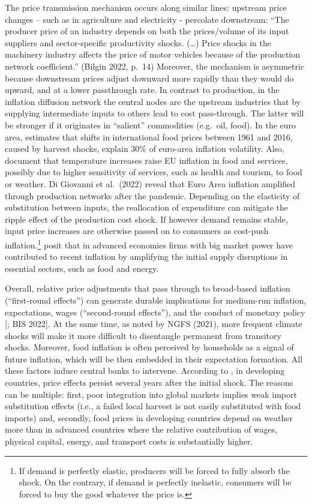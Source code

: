 \documentclass[
  letterpaper,
  DIV=11,
  numbers=noendperiod]{scrartcl}
\begin{document}
The price transmission mechanism occurs along similar lines: upstream
price changes -- such as in agriculture and electricity - percolate
downstream: ``The producer price of an industry depends on both the
prices/volume of its input suppliers and sector-specific productivity
shocks. (\ldots) Price shocks in the machinery industry affects the
price of motor vehicles because of the production network coefficient.''
(Bilgin 2022, p.~14) Moreover, the mechanism is asymmetric because
downstream prices adjust downward more rapidly than they would do
upward, and at a lower passthrough rate. In contrast to production, in
the inflation diffusion network the central nodes are the upstream
industries that by supplying intermediate inputs to others lead to cost
pass-through. The latter will be stronger if it originates in
``salient'' commodities (e.g.~oil, food). In the euro area,
\citet{peersman2022} estimates that shifts in international food prices
between 1961 and 2016, caused by harvest shocks, explain 30\% of
euro-area inflation volatility. Also, \citet{ciccarelli2023} document
that temperature increases raise EU inflation in food and services,
possibly due to higher sensitivity of services, such as health and
tourism, to food or weather. Di Giovanni et al.~(2022) reveal that Euro
Area inflation amplified through production networks after the pandemic.
Depending on the elasticity of substitution between inputs, the
reallocation of expenditure can mitigate the ripple effect of the
production cost shock. If however demand remains stable, input price
increases are otherwise passed on to consumers as cost-push
inflation.\footnote{If demand is perfectly elastic, producers will be
  forced to fully absorb the shock. On the contrary, if demand is
  perfectly inelastic, consumers will be forced to buy the good whatever
  the price is.} \citet{weber2023} posit that in advanced economies
firms with big market power have contributed to recent inflation by
amplifying the initial supply disruptions in essential sectors, such as
food and energy.

Overall, relative price adjustments that pass through to broad-based
inflation (``first-round effects'') can generate durable implications
for medium-run inflation, expectations, wages (``second-round
effects''), and the conduct of monetary policy {[}\citet{reis2010}; BIS
2022{]}. At the same time, as noted by NGFS (2021), more frequent
climate shocks will make it more difficult to disentangle permanent from
transitory shocks. Moreover, food inflation is often perceived by
households as a signal of future inflation, which will be then embedded
in their expectation formation. All these factors induce central banks
to intervene. According to \citet{mukherjee2021}, in developing
countries, price effects persist several years after the initial shock.
The reasons can be multiple: first, poor integration into global markets
implies weak import substitution effects (i.e., a failed local harvest
is not easily substituted with food imports) and, secondly, food prices
in developing countries depend on weather more than in advanced
countries where the relative contribution of wages, physical capital,
energy, and transport costs is substantially higher.
\end{document}
